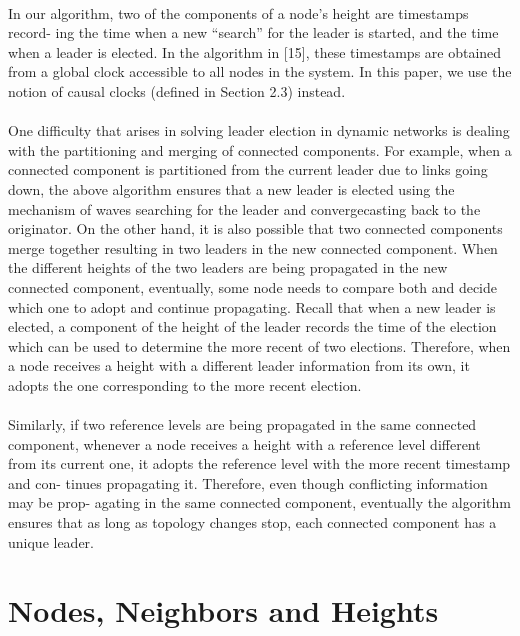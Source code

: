 \paragraph{}In our algorithm, two of the components of a node’s height are timestamps record- ing the time when a new “search” for the leader is started, and the time when a leader is elected. In the algorithm in [15], these timestamps are obtained from a global clock accessible to all nodes in the system. In this paper, we use the notion of causal clocks (defined in Section 2.3) instead.
\paragraph{}One difficulty that arises in solving leader election in dynamic networks is dealing with the partitioning and merging of connected components. For example, when a connected component is partitioned from the current leader due to links going down, the above algorithm ensures that a new leader is elected using the mechanism of waves searching for the leader and convergecasting back to the originator. On the other hand, it is also possible that two connected components merge together resulting in two leaders in the new connected component. When the different heights of the two leaders are being propagated in the new connected component, eventually, some node needs to compare both and decide which one to adopt and continue propagating. Recall that when a new leader is elected, a component of the height of the leader records the time of the election which can be used to determine the more recent of two elections. Therefore, when a node receives a height with a different leader information from its own, it adopts the one corresponding to the more recent election.
\paragraph{}Similarly, if two reference levels are being propagated in the same connected component, whenever a node receives a height with a reference level different from its current one, it adopts the reference level with the more recent timestamp and con- tinues propagating it. Therefore, even though conflicting information may be prop- agating in the same connected component, eventually the algorithm ensures that as long as topology changes stop, each connected component has a unique leader.
\section{Nodes, Neighbors and Heights}
